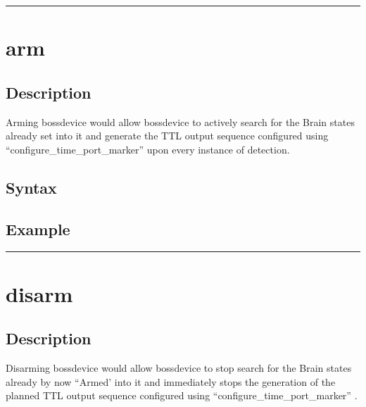 \documentclass[letterpaper,10pt,english]{sphinxmanual}
\begin{document}
\bigskip\hrule\bigskip



\section{arm}
\label{\detokenize{4_api_documentation:arm}}

\subsection{Description}
\label{\detokenize{4_api_documentation:id41}}
\sphinxAtStartPar
Arming bossdevice would allow bossdevice to actively search for the Brain states already set into it and generate the TTL output sequence configured using “configure\_time\_port\_marker” upon every instance of detection.


\subsection{Syntax}
\label{\detokenize{4_api_documentation:id42}}
\begin{sphinxVerbatim}[commandchars=\\\{\}]
\end{sphinxVerbatim}


\subsection{Example}
\label{\detokenize{4_api_documentation:id43}}
\begin{sphinxVerbatim}[commandchars=\\\{\}]
\end{sphinxVerbatim}


\bigskip\hrule\bigskip



\section{disarm}
\label{\detokenize{4_api_documentation:disarm}}

\subsection{Description}
\label{\detokenize{4_api_documentation:id44}}
\sphinxAtStartPar
Disarming bossdevice would allow bossdevice to stop search for the Brain states already by now “Armed’ into it and immediately stops the generation of the planned TTL output sequence configured using “configure\_time\_port\_marker” .
\end{document}
